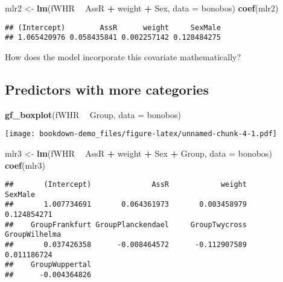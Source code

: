 \documentclass[]{book}
\newenvironment{Shaded}{\begin{snugshade}}{\end{snugshade}}
\newcommand{\DataTypeTok}[1]{\textcolor[rgb]{0.13,0.29,0.53}{#1}}
\newcommand{\KeywordTok}[1]{\textcolor[rgb]{0.13,0.29,0.53}{\textbf{#1}}}
\newcommand{\NormalTok}[1]{#1}
\newcommand{\OperatorTok}[1]{\textcolor[rgb]{0.81,0.36,0.00}{\textbf{#1}}}
\newcommand{\StringTok}[1]{\textcolor[rgb]{0.31,0.60,0.02}{#1}}
\begin{document}
\begin{Shaded}
\begin{Highlighting}[]
\NormalTok{mlr2 <-}\StringTok{ }\KeywordTok{lm}\NormalTok{(fWHR }\OperatorTok{~}\StringTok{ }\NormalTok{AssR }\OperatorTok{+}\StringTok{ }\NormalTok{weight }\OperatorTok{+}\StringTok{ }\NormalTok{Sex, }\DataTypeTok{data =}\NormalTok{ bonobos)}
\KeywordTok{coef}\NormalTok{(mlr2)}
\end{Highlighting}
\end{Shaded}

\begin{verbatim}
## (Intercept)        AssR      weight     SexMale 
## 1.065420976 0.058435841 0.002257142 0.128484275
\end{verbatim}

How does the model incorporate this covariate mathematically?

\vspace{1.75in}

\hypertarget{predictors-with-more-categories}{%
\subsection{Predictors with more categories}\label{predictors-with-more-categories}}

\begin{Shaded}
\begin{Highlighting}[]
\KeywordTok{gf_boxplot}\NormalTok{(fWHR }\OperatorTok{~}\StringTok{ }\NormalTok{Group, }\DataTypeTok{data =}\NormalTok{ bonobos)}
\end{Highlighting}
\end{Shaded}

\texttt{[image: bookdown-demo\_files/figure-latex/unnamed-chunk-4-1.pdf]}

\begin{Shaded}
\begin{Highlighting}[]
\NormalTok{mlr3 <-}\StringTok{ }\KeywordTok{lm}\NormalTok{(fWHR }\OperatorTok{~}\StringTok{ }\NormalTok{AssR }\OperatorTok{+}\StringTok{ }\NormalTok{weight }\OperatorTok{+}\StringTok{ }\NormalTok{Sex }\OperatorTok{+}\StringTok{ }\NormalTok{Group, }\DataTypeTok{data =}\NormalTok{ bonobos)}
\KeywordTok{coef}\NormalTok{(mlr3)}
\end{Highlighting}
\end{Shaded}

\begin{verbatim}
##       (Intercept)              AssR            weight           SexMale 
##       1.007734691       0.064361973       0.003458979       0.124854271 
##    GroupFrankfurt GroupPlanckendael     GroupTwycross     GroupWilhelma 
##       0.037426358      -0.008464572      -0.112907589       0.011186724 
##    GroupWuppertal 
##      -0.004364826
\end{verbatim}
\end{document}
